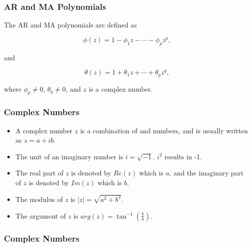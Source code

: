 \documentclass[%
xcolor=pdftex]{beamer}
\begin{document}
\begin{frame}
\frametitle{AR and MA Polynomials}

The AR and MA polynomials are defined as

\begin{equation} \label{eq:ar_poly}
\phi(z) = 1 - \phi_1 z - \cdots - \phi_p z^p,
\end{equation}

and

\begin{equation} \label{eq:ma_poly}
\theta(z) = 1 + \theta_1 z + \cdots + \theta_p z^q,
\end{equation}

where $\phi_p \neq 0$, $\theta_q \neq 0$, and $z$ is a complex number.

\end{frame}

\begin{frame}
\frametitle{Complex Numbers}

\begin{itemize}

\item A complex number $z$ is a combination of \underline{\hspace{8 mm}} and \underline{\hspace{15 mm}} numbers, and is usually written as $z = a + ib$.

\item The unit of an imaginary number is $i = \sqrt{-1}$. $i^2$ results in -1.

\item The real part of $z$ is denoted by $Re(z)$ which is $a$, and the imaginary part of $z$ is denoted by $Im(z)$ which is $b$.

\item The modulus of $z$ is $|z| = \sqrt{a^2 + b^2}$.

\item The argument of $z$ is $arg(z) = \tan^{-1} (\frac{b}{a})$.

\end{itemize}



\end{frame}


\begin{frame}
\frametitle{Complex Numbers}








\end{frame}
\end{document}
